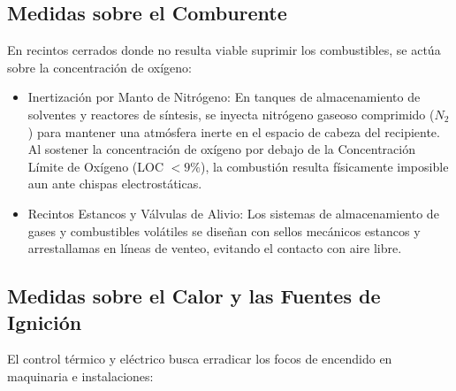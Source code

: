 \subsection{Medidas sobre el Comburente}

En recintos cerrados donde no resulta viable suprimir los combustibles, se actúa sobre la concentración de oxígeno:

\begin{itemize}
    \item Inertización por Manto de Nitrógeno: En tanques de almacenamiento de solventes y reactores de síntesis, se
          inyecta nitrógeno gaseoso comprimido ($N_2$) para mantener una atmósfera inerte en el espacio de cabeza del
          recipiente. Al sostener la concentración de oxígeno por debajo de la Concentración Límite de Oxígeno (LOC $<
          9\percent$), la combustión resulta físicamente imposible aun ante chispas electrostáticas.
    \item Recintos Estancos y Válvulas de Alivio: Los sistemas de almacenamiento de gases y combustibles volátiles se
          diseñan con sellos mecánicos estancos y arrestallamas en líneas de venteo, evitando el contacto con aire libre.
\end{itemize}

\subsection{Medidas sobre el Calor y las Fuentes de Ignición}

El control térmico y eléctrico busca erradicar los focos de encendido en maquinaria e instalaciones:

